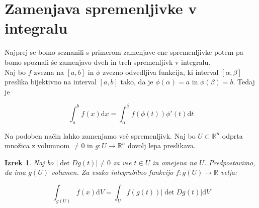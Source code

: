\documentclass[12pt, a4paper]{article}
\newtheorem{izrek}{Izrek}
\begin{document}
\section{Zamenjava spremenljivke v integralu}
Najprej se bomo seznanili s primerom zamenjave ene spremenljivke potem pa bomo spoznali še zamenjavo dveh in treh spremenljivk v integralu.
\\
Naj bo $f$ zvezna na $[a,b]$ in $\phi$ zvezno odvedljiva funkcija, ki interval $[\alpha,\beta]$ preslika bijektivno na interval $[a,b]$ tako, da je  $\phi(\alpha)=a$ in $\phi(\beta)=b$. Tedaj je

$$\int_{a}^bf(x)\mathrm{d} x=\int_{\alpha}^{\beta}f(\phi(t))\phi'(t)\mathrm{d} t$$

Na podoben način lahko zamenjamo več spremenljivk. Naj bo $U \subset \mathbb{R}^n$ odprta množica z volumnom $\neq 0$ in $g:U \rightarrow \mathbb{R}^n$ dovolj lepa preslikava.
\begin{izrek}
 Naj bo $\big | \det Dg(t) \big |\neq 0$ za vse $t \in U$ in omejena na $U$. Predpostavimo, da ima $g(U)$ volumen. Za vsako integrabilno funkcijo $f:g(U) \rightarrow \mathbb{R}$ velja:

$$\int_{g(U)}^{}f(x) \mathrm{d} V=\int_{U}^{}f(g(t)) \big |\det Dg(t) \big | \mathrm{d} V$$
\end{izrek}
\end{document}
